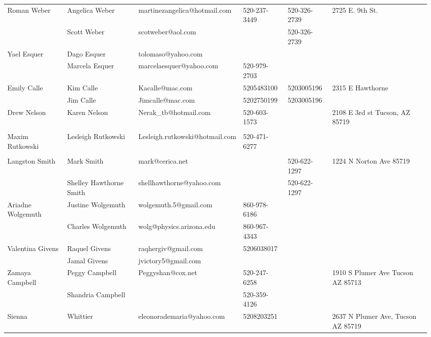 \documentclass[landscape]{article}\usepackage[]{graphicx}\usepackage[]{color}
\begin{document}
\begin{longtable}{p{70pt}|p{75pt}|p{120pt}|p{60pt}|p{60pt}|p{120pt}|}
\hline
\multirow{2}{70pt}{Roman Weber} & Angelica Weber & martinezangelica@hotmail.com & 520-237-3449 & 520-326-2739 & \multirow{2}{100pt}{2725 E. 9th St.} \\
 & Scott Weber & scotweber@aol.com &  & 520-326-2739 & \\
\hline
\multirow{2}{70pt}{Yael Esquer} & Dago Esquer & tolomaso@yahoo.com &  &  & \multirow{2}{100pt}{} \\
 & Marcela Esquer & marcelaesquer@yahoo.com & 520-979-2703 &  & \\
\hline
\multirow{2}{70pt}{Emily Calle} & Kim Calle & Kacalle@mac.com & 5205483100 & 5203005196 & \multirow{2}{100pt}{2315 E Hawthorne} \\
 & Jim Calle & Jimcalle@mac.com & 5202750199 & 5203005196 & \\
\hline
\multirow{2}{70pt}{Drew Nelson} & Karen Nelson & Nerak\_tb@hotmail.com & 520-603-1573 &  & \multirow{2}{100pt}{2108 E 3rd st Tucson, AZ 85719} \\
 &  &  &  &  & \\
\hline
\multirow{2}{70pt}{Maxim Rutkowski } & Lesleigh Rutkowski  & Lesleigh.rutkowski@hotmail.com & 520-471-6277 &  & \multirow{2}{100pt}{} \\
 &  &  &  &  & \\
\hline
\multirow{2}{70pt}{Langston Smith} & Mark Smith & mark@cerica.net &  & 520-622-1297 & \multirow{2}{100pt}{1224 N Norton Ave 85719} \\
 & Shelley Hawthorne Smith & shellhawthorne@yahoo.com &  & 520-622-1297 & \\
\hline
\multirow{2}{70pt}{Ariadne Wolgemuth} & Justine Wolgemuth & wolgemuth.5@gmail.com & 860-978-6186 &  & \multirow{2}{100pt}{} \\
 & Charles Wolgemuth & wolg@physics.arizona.edu & 860-967-4343 &  & \\
\hline
\multirow{2}{70pt}{Valentina Givens} & Raquel Givens & raqhergiv@gmail.com & 5206038017 &  & \multirow{2}{100pt}{} \\
 & Jamal Givens & jvictory5@gmail.com &  &  & \\
\hline
\multirow{2}{70pt}{Zamaya Campbell } & Peggy Campbell  & Peggyshan@cox.net & 520-247-6258 &  & \multirow{2}{100pt}{1910 S Plumer Ave Tucson AZ 85713} \\
 & Shandria Campbell  &  & 520-359-4126 &  & \\
\hline
\multirow{2}{70pt}{Sienna} & Whittier & eleonorademaria@yahoo.com & 5208203251 &  & \multirow{2}{100pt}{2637 N Plumer Ave, Tucson AZ 85719} \\

\end{longtable}
\end{document}
